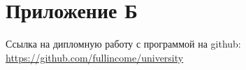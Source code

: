 \section*{Приложение Б}
\label{sec:Appendix_2} 
\large 

Ссылка на дипломную работу с программой на github:\\
\href{https://github.com/fullincome/university}{https://github.com/fullincome/university}
